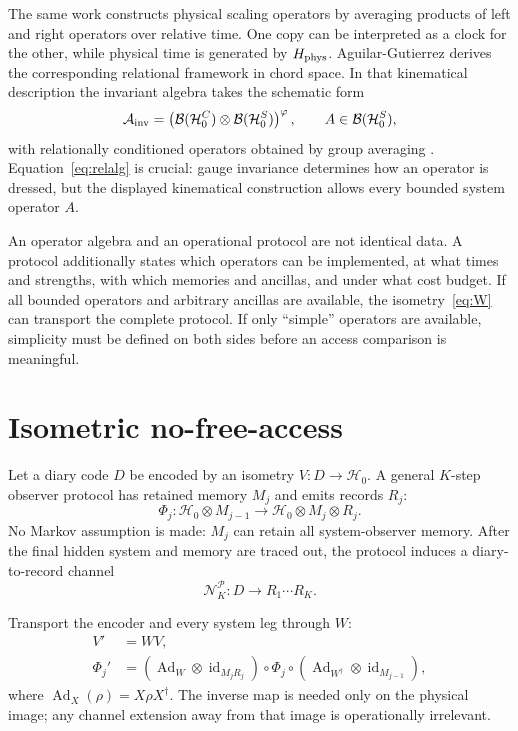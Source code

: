 \documentclass[11pt]{article}
\newcommand{\cA}{\mathcal A}
\newcommand{\cB}{\mathcal B}
\newcommand{\cH}{\mathcal H}
\newcommand{\cN}{\mathcal N}
\newcommand{\cP}{\mathcal P}
\newcommand{\id}{\operatorname{id}}
\newcommand{\Ad}{\operatorname{Ad}}
\begin{document}
The same work constructs physical scaling operators by averaging products of
left and right operators over relative time.  One copy can be interpreted as
a clock for the other, while physical time is generated by
$H_{\rm phys}$.  Aguilar-Gutierrez derives the corresponding relational
framework in chord space.  In that kinematical description the invariant
algebra takes the schematic form
\begin{equation}
  \cA_{\rm inv}
  =\left(\cB(\cH_0^C)\otimes\cB(\cH_0^S)\right)^{\varphi},
  \qquad A\in\cB(\cH_0^S),
  \label{eq:relalg}
\end{equation}
with relationally conditioned operators obtained by group averaging
\citep{AguilarRelational2025}.  Equation~\eqref{eq:relalg} is crucial: gauge
invariance determines how an operator is dressed, but the displayed
kinematical construction allows every bounded system operator $A$.

An operator algebra and an operational protocol are not identical data.  A
protocol additionally states which operators can be implemented, at what
times and strengths, with which memories and ancillas, and under what cost
budget.  If all bounded operators and arbitrary ancillas are available, the
isometry~\eqref{eq:W} can transport the complete protocol.  If only ``simple''
operators are available, simplicity must be defined on both sides before an
access comparison is meaningful.

\section{Isometric no-free-access}
\label{sec:invariance}

Let a diary code $D$ be encoded by an isometry $V:D\to\cH_0$.  A general
$K$-step observer protocol has retained memory $M_j$ and emits records $R_j$:
\begin{equation}
  \Phi_j:
  \cH_0\otimes M_{j-1}\longrightarrow
  \cH_0\otimes M_j\otimes R_j.
  \label{eq:protocol}
\end{equation}
No Markov assumption is made: $M_j$ can retain all system-observer memory.
After the final hidden system and memory are traced out, the protocol induces
a diary-to-record channel
\begin{equation}
  \cN_K^{\cP}:D\longrightarrow R_1\cdots R_K.
  \label{eq:recordchannel}
\end{equation}

Transport the encoder and every system leg through $W$:
\begin{align}
  V'&=WV,\nonumber\\
  \Phi_j'&=
  (\Ad_W\otimes\id_{M_jR_j})\circ\Phi_j\circ
  (\Ad_{W^\dagger}\otimes\id_{M_{j-1}}),
  \label{eq:transport}
\end{align}
where $\Ad_X(\rho)=X\rho X^\dagger$.  The inverse map is needed only on the
physical image; any channel extension away from that image is operationally
irrelevant.
\end{document}
